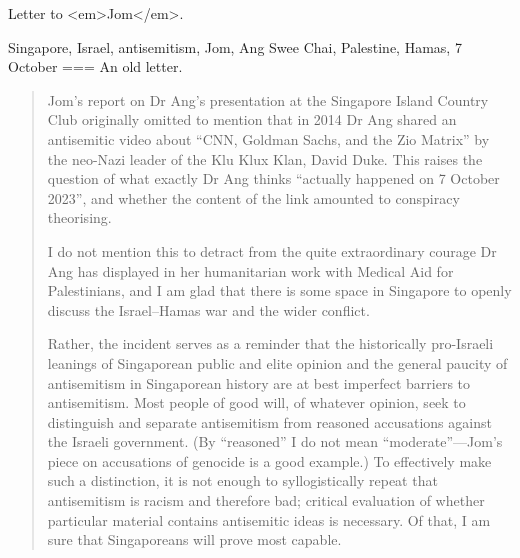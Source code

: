 Letter to <em>Jom</em>.

Singapore, Israel, antisemitism, Jom, Ang Swee Chai, Palestine, Hamas, 7 October
===
An old letter.
\begin{quote}
Jom’s report on Dr Ang’s presentation at the Singapore Island Country Club originally omitted to mention that in 2014 Dr Ang shared an antisemitic video about “CNN, Goldman Sachs, and the Zio Matrix” by the neo-Nazi leader of the Klu Klux Klan, David Duke. This raises the question of what exactly Dr Ang thinks “actually happened on 7 October 2023”, and whether the content of the link amounted to conspiracy theorising.

I do not mention this to detract from the quite extraordinary courage Dr Ang has displayed in her humanitarian work with Medical Aid for Palestinians, and I am glad that there is some space in Singapore to openly discuss the Israel–Hamas war and the wider conflict.

Rather, the incident serves as a reminder that the historically pro-Israeli leanings of Singaporean public and elite opinion and the general paucity of antisemitism in Singaporean history are at best imperfect barriers to antisemitism. Most people of good will, of whatever opinion, seek to distinguish and separate antisemitism from reasoned accusations against the Israeli government. (By “reasoned” I do not mean “moderate”—Jom’s piece on accusations of genocide is a good example.) To effectively make such a distinction, it is not enough to syllogistically repeat that antisemitism is racism and therefore bad; critical evaluation of whether particular material contains antisemitic ideas is necessary. Of that, I am sure that Singaporeans will prove most capable.
\end{quote}

\nocite{loo2024a}